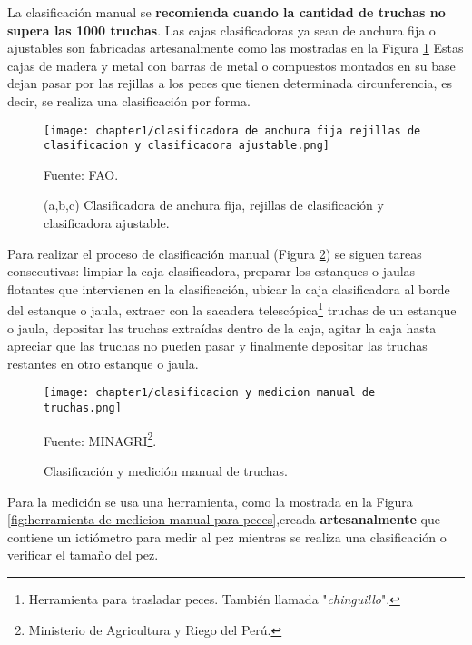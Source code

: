 La clasificación manual se \textbf{recomienda cuando la cantidad de truchas no supera las 1000 truchas}.\cite[p.~25]{FAO2014} Las cajas clasificadoras ya sean de anchura fija o ajustables son fabricadas artesanalmente como las mostradas en la Figura \ref{fig:clasificadora de anchura fija rejillas de clasificacion y clasificadora ajustable} Estas cajas de madera y metal con barras de metal o compuestos montados en su base dejan pasar por las rejillas a los peces que tienen determinada circunferencia, es decir, se realiza una clasificación por forma.\cite{FAO2005} \\

\begin{figure}[H]
	\centering
	\texttt{[image: chapter1/clasificadora de anchura fija rejillas de clasificacion y clasificadora ajustable.png]}
	\caption{(a,b,c) Clasificadora de anchura fija, rejillas de clasificación y clasificadora ajustable.}
	Fuente: FAO.
	\label{fig:clasificadora de anchura fija rejillas de clasificacion y clasificadora ajustable}
\end{figure}

Para realizar el proceso de clasificación manual (Figura \ref{fig:clasificacion y medicion manual de truchas}) se siguen tareas consecutivas: limpiar la caja clasificadora, preparar los estanques o jaulas flotantes que intervienen en la clasificación, ubicar la caja clasificadora al borde del estanque o jaula, extraer con la sacadera telescópica\footnote{Herramienta para trasladar peces. También llamada "\textit{chinguillo}".} truchas de un estanque o jaula, depositar las truchas extraídas dentro de la caja, agitar la caja hasta apreciar que las truchas no pueden pasar y finalmente depositar las truchas restantes en otro estanque o jaula.\\

\begin{figure}[H]
	\centering
	\texttt{[image: chapter1/clasificacion y medicion manual de truchas.png]}
	\caption{Clasificación y medición manual de truchas.}
	Fuente: MINAGRI\footnote{Ministerio de Agricultura y Riego del Perú.}.
	\label{fig:clasificacion y medicion manual de truchas}
\end{figure}

Para la medición se usa una herramienta, como la mostrada en la Figura \ref{fig:herramienta de medicion manual para peces},creada \textbf{artesanalmente} que contiene un ictiómetro para medir al pez mientras se realiza una clasificación o verificar el tamaño del pez. \\

